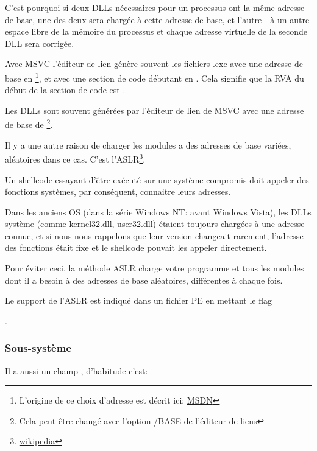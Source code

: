 C'est pourquoi si deux DLLs nécessaires pour un processus ont la même adresse de base,
une des deux sera chargée à cette adresse de base, et l'autre---à un autre espace
libre de la mémoire du processus et chaque adresse virtuelle de la seconde DLL sera
corrigée.

\par Avec \ac{MSVC} l'éditeur de lien génère souvent les fichiers .exe avec une adresse
de base en \footnote{L'origine de ce choix d'adresse est décrit ici:
\href{http://go.yurichev.com/17041}{MSDN}}, et avec une section de code débutant
en .
Cela signifie que la \ac{RVA} du début de la section de code est .

Les DLLs sont souvent générées par l'éditeur de lien de MSVC avec une adresse de
base de \footnote{Cela peut être changé avec l'option /BASE de l'éditeur
de liens}.


Il y a une autre raison de charger les modules a des adresses de base variées, aléatoires
dans ce cas. C'est l'\ac{ASLR}\footnote{\href{http://go.yurichev.com/17140}{wikipedia}}.


Un shellcode essayant d'être exécuté sur une système compromis doit appeler des fonctions
systèmes, par conséquent, connaitre leurs adresses.

Dans les anciens \ac{OS} (dans la série \gls{Windows NT}: avant Windows Vista), les
DLLs système (comme kernel32.dll, user32.dll) étaient toujours chargées à une adresse
connue, et si nous nous rappelons que leur version changeait rarement, l'adresse
des fonctions était fixe et le shellcode pouvait les appeler directement.

Pour éviter ceci, la méthode \ac{ASLR} charge votre programme et tous les modules
dont il a besoin à des adresses de base aléatoires, différentes à chaque fois.

Le support de l'\ac{ASLR} est indiqué dans un fichier PE en mettant le flag
\par {} .

\subsubsection{Sous-système}

Il a aussi un champ , d'habitude c'est:

